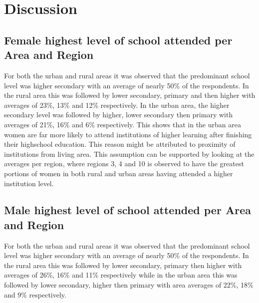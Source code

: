 \documentclass[stu, 12pt, floatsintext,longtable]{apa7}
\begin{document}
\newpage
\section{Discussion}
\subsection{Female highest level of school attended per Area and Region}

For both the urban and rural areas it was observed that the predominant school
level was higher secondary with an average of nearly 50\% of the respondents.
In the rural area this was followed by lower secondary,
primary and then higher with averages of 23\%, 13\% and 12\% respectively.
In the urban area, the higher secondary level was followed by higher, lower
secondary then primary with averages of 21\%, 16\% and 6\% respectively.
This shows that in the urban area women are far more likely to attend
institutions of higher learning after finishing their highschool education.
This reason might be attributed to proximity of institutions from living area.
This assumption can be supported by looking at the averages per region, where
regions 3, 4 and 10 is observed to have the greatest portions of women in both
rural and urban areas having attended a higher institution level.

\subsection{Male highest level of school attended per Area and Region}
For both the urban and rural areas it was observed that the predominant school
level was higher secondary with an average of nearly 50\% of the respondents.
In the rural area this was followed by lower secondary, primary then higher
with averages of 26\%, 16\% and 11\% respectively while in the
urban area this was followed by lower secondary, higher then primary with area
averages of 22\%, 18\% and 9\%
respectively.
\printbibliography
\end{document}
